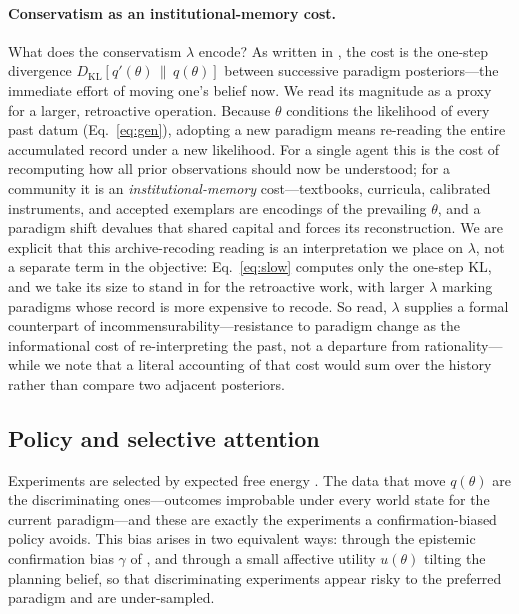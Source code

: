 \documentclass[11pt,a4paper]{article}
\newcommand{\theory}{\theta}
\newcommand{\KL}[2]{D_{\mathrm{KL}}\!\left[#1\,\|\,#2\right]}
\begin{document}
\paragraph{Conservatism as an institutional-memory cost.}
What does the conservatism $\lambda$ encode? As written in
\citet{hylandAlbarracin2025MindChange}, the cost is the one-step divergence
$\KL{q'(\theory)}{q(\theory)}$ between successive paradigm posteriors---the immediate
effort of moving one's belief now. We read its magnitude as a proxy for a larger,
retroactive operation. Because $\theory$ conditions the likelihood of every past
datum (Eq.~\ref{eq:gen}), adopting a new paradigm means re-reading the entire
accumulated record under a new likelihood. For a single agent this is the cost of
recomputing how all prior observations should now be understood; for a community it
is an \emph{institutional-memory} cost---textbooks, curricula, calibrated
instruments, and accepted exemplars are encodings of the prevailing $\theory$, and a
paradigm shift devalues that shared capital and forces its reconstruction. We are
explicit that this archive-recoding reading is an interpretation we place on
$\lambda$, not a separate term in the objective: Eq.~\eqref{eq:slow} computes only
the one-step KL, and we take its size to stand in for the retroactive work, with
larger $\lambda$ marking paradigms whose record is more expensive to recode. So read,
$\lambda$ supplies a formal counterpart of incommensurability---resistance to
paradigm change as the informational cost of re-interpreting the past, not a
departure from rationality---while we note that a literal accounting of that cost
would sum over the history rather than compare two adjacent posteriors.

\subsection{Policy and selective attention}
\label{ssec:policy}

Experiments are selected by expected free energy
\citep{friston2015ActiveInferenceEpistemic}. The data that move $q(\theory)$ are
the discriminating ones---outcomes improbable under every world state for the
current paradigm---and these are exactly the experiments a confirmation-biased
policy avoids. This bias arises in two equivalent ways: through the epistemic
confirmation bias $\gamma$ of \citet{albarracin2022EpistemicCommunities}, and
through a small affective utility $u(\theory)$ tilting the planning belief, so that
discriminating experiments appear risky to the preferred paradigm and are
under-sampled.
\end{document}
